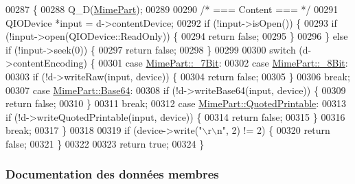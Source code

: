 \begin{DoxyCode}
00287 \{
00288     Q\_D(\hyperlink{class_simple_mail_1_1_mime_part}{MimePart});
00289 
00290     \textcolor{comment}{/* === Content === */}
00291     QIODevice *input = d->contentDevice;
00292     \textcolor{keywordflow}{if} (!input->isOpen()) \{
00293         \textcolor{keywordflow}{if} (!input->open(QIODevice::ReadOnly)) \{
00294             \textcolor{keywordflow}{return} \textcolor{keyword}{false};
00295         \}
00296     \} \textcolor{keywordflow}{else} \textcolor{keywordflow}{if} (!input->seek(0)) \{
00297         \textcolor{keywordflow}{return} \textcolor{keyword}{false};
00298     \}
00299 
00300     \textcolor{keywordflow}{switch} (d->contentEncoding) \{
00301     \textcolor{keywordflow}{case} \hyperlink{class_simple_mail_1_1_mime_part_ae67a2f5406958b95b18bf31a7bbeb5c9a93d518d86036ce6f149ffa646b52235a}{MimePart::\_7Bit}:
00302     \textcolor{keywordflow}{case} \hyperlink{class_simple_mail_1_1_mime_part_ae67a2f5406958b95b18bf31a7bbeb5c9a27c1574a6fe2fa936ae6cfe9654bb37f}{MimePart::\_8Bit}:
00303         \textcolor{keywordflow}{if} (!d->writeRaw(input, device)) \{
00304             \textcolor{keywordflow}{return} \textcolor{keyword}{false};
00305         \}
00306         \textcolor{keywordflow}{break};
00307     \textcolor{keywordflow}{case} \hyperlink{class_simple_mail_1_1_mime_part_ae67a2f5406958b95b18bf31a7bbeb5c9ae644dc14ba856889814d2da9c995b91a}{MimePart::Base64}:
00308         \textcolor{keywordflow}{if} (!d->writeBase64(input, device)) \{
00309             \textcolor{keywordflow}{return} \textcolor{keyword}{false};
00310         \}
00311         \textcolor{keywordflow}{break};
00312     \textcolor{keywordflow}{case} \hyperlink{class_simple_mail_1_1_mime_part_ae67a2f5406958b95b18bf31a7bbeb5c9a29b5533d69a04cfef2c3ff6538c44db0}{MimePart::QuotedPrintable}:
00313         \textcolor{keywordflow}{if} (!d->writeQuotedPrintable(input, device)) \{
00314             \textcolor{keywordflow}{return} \textcolor{keyword}{false};
00315         \}
00316         \textcolor{keywordflow}{break};
00317     \}
00318 
00319     \textcolor{keywordflow}{if} (device->write(\textcolor{stringliteral}{"\(\backslash\)r\(\backslash\)n"}, 2) != 2) \{
00320         \textcolor{keywordflow}{return} \textcolor{keyword}{false};
00321     \}
00322 
00323     \textcolor{keywordflow}{return} \textcolor{keyword}{true};
00324 \}
\end{DoxyCode}


\subsubsection{Documentation des données membres}
\mbox{\label{class_simple_mail_1_1_mime_part_a6adc00256ce96a9282f2ec0224625b0b}} 
